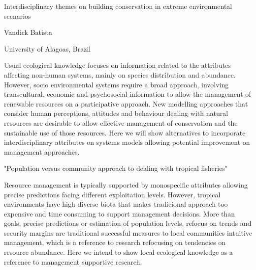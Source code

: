 \documentclass[a4paper]{article}
\begin{document}

\Large
 \begin{center}
    Interdisciplinary themes on building conservation in extreme environmental scenarios\\ 

\hspace{10pt}

\large
Vandick Batista

\hspace{10pt}

\small  
University of Alagoas, Brazil\\

\end{center}

\hspace{10pt}

\normalsize

Usual ecological knowledge focuses on information related to the attributes affecting non-human systems, mainly on species distribution and abundance. However,  socio environmental systems require a broad approach, involving transcultural, economic and psychosocial information to allow the management of renewable resources on a participative approach. New modelling approaches that consider human perceptions, attitudes and behaviour dealing with natural resources are desirable to allow effective management of conservation and the sustainable use of those resources. Here we will show alternatives to incorporate interdisciplinary attributes on systems models allowing potential improvement on management approaches.

"Population versus community approach to dealing with tropical fisheries" 

Resource management is typically supported by monospecific attributes allowing precise predictions facing different exploitation levels. However, tropical environments have high diverse biota that makes tradicional approach too expensive and time consuming to support management decisions. More than goals, precise predictions or estimation of population levels, refocus on trends and security margins are traditional successful measures to local communities intuitive management, which is a reference to research refocusing on tendencies on resource abundance. Here we intend to show local ecological knowledge as a reference to management supportive research.
\end{document}
